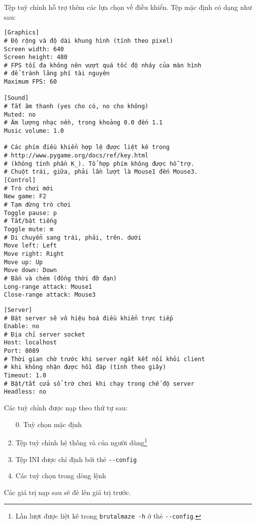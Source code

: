 \documentclass[a4paper,11pt]{article}
\begin{document}
Tệp tuỳ chỉnh hỗ trợ thêm các lựa chọn về điều khiển. Tệp mặc định có dạng như
sau:
\begin{verbatim}
[Graphics]
# Độ rộng và độ dài khung hình (tính theo pixel)
Screen width: 640
Screen height: 480
# FPS tối đa không nên vượt quá tốc độ nháy của màn hình
# để tránh lãng phí tài nguyên
Maximum FPS: 60

[Sound]
# Tắt âm thanh (yes cho có, no cho không)
Muted: no
# Âm lượng nhạc nền, trong khoảng 0.0 đến 1.1
Music volume: 1.0

# Các phím điều khiển hợp lệ được liệt kê trong
# http://www.pygame.org/docs/ref/key.html
# (không tính phần K_). Tổ hợp phím không được hỗ trợ.
# Chuột trái, giữa, phải lần lượt là Mouse1 đến Mouse3.
[Control]
# Trò chơi mới
New game: F2
# Tạm dừng trò chơi
Toggle pause: p
# Tắt/bật tiếng
Toggle mute: m
# Di chuyển sang trái, phải, trên. dưới
Move left: Left
Move right: Right
Move up: Up
Move down: Down
# Bắn và chém (đồng thời đỡ đạn)
Long-range attack: Mouse1
Close-range attack: Mouse3
\end{verbatim}

\newpage
\begin{verbatim}
[Server]
# Bật server sẽ vô hiệu hoá điều khiển trực tiếp
Enable: no
# Địa chỉ server socket
Host: localhost
Port: 8089
# Thời gian chờ trước khi server ngắt kết nối khỏi client
# khi không nhận được hồi đáp (tính theo giây)
Timeout: 1.0
# Bật/tắt cửa sổ trờ chơi khi chạy trong chế độ server
Headless: no
\end{verbatim}
Các tuỳ chỉnh được nạp theo thứ tự sau:
\begin{enumerate}
  \item[0.] Tuỳ chọn mặc định
  \item Tệp tuỳ chỉnh hệ thống và của người dùng\footnote{Lần lượt được liệt kê
    trong \texttt{brutalmaze -h} ở thẻ \texttt{-{}-config}.}
  \item Tệp INI được chỉ định bởi thẻ \verb|--config|
  \item Các tuỳ chọn trong dòng lệnh
\end{enumerate}
Các giá trị nạp sau sẽ đè lên giá trị trước.
\end{document}
